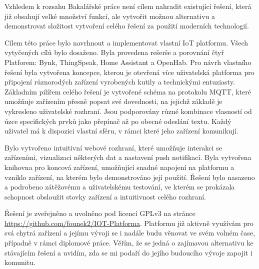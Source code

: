 \documentclass[thesis=B,czech]{FITthesis}[2019/12/23]
\begin{document}
Vzhledem k rozsahu Bakalářské práce není cílem nahradit existující řešení, která již obsahují velké množství funkcí, ale vytvořit možnou alternativu a demonstrovat složitost vytvoření celého řešení za použití moderních technologií.









\begin{conclusion}
    Cílem této práce bylo navrhnout a implementovat vlastní IoT platformu. Všech vytyčených cílů bylo dosaženo. Byla provedena rešerše a porovnání čtyř Platforem: Bynk, ThingSpeak, Home Assistant a OpenHab. Pro návrh vlastního řešení byla vytvořena koncepce, kterou je otevřená více uživatelská platforma pro připojení různorodých zařízení vyrobených kutily a technickými entuziasty. Základním pilířem celého řešení je vytvořené schéma na protokolu MQTT, které umožňuje zařízením přesně popsat své dovednosti, na jejichž základě je vykresleno uživatelské rozhraní. Jsou podporovány různé kombinace vlasností od úzce specifických prvků jako přepínač až po obecné odeslání textu. Každý uživatel má k dispozici vlastní sféru, v rámci které jeho zařízení komunikují.

    Bylo vytvořeno intuitivní webové rozhraní, které umožňuje interakci se zařízeními, vizualizaci některých dat a nastavení push notifikací. Byla vytvořena knihovna pro koncová zařízení, umožňující snadné napojení na platformu a vzniklo zařízení, na kterém bylo demonstrováno její použití. Řešení bylo nasazeno a podrobeno zátěžovému a uživatelskému testování, ve kterém se prokázala schopnost obsloužit stovky zařízení a intuitivnost celého rozhraní.

    Řešení je zveřejněno a uvolněno pod licencí GPLv3 na stránce \url{https://github.com/founek2/IOT-Platforma}. Platformu již aktivně využívám pro svá chytrá zařízení a jejímu vývoji se i nadále budu věnovat ve svém volném čase, případně v rámci diplomové práce. Věřím, že se jedná o zajímavou alternativu ke stávajícím řešení a uvidím, zda se mi podaří do jejího budoucího vývoje zapojit i komunitu.
\end{conclusion}




\appendix
\end{document}
